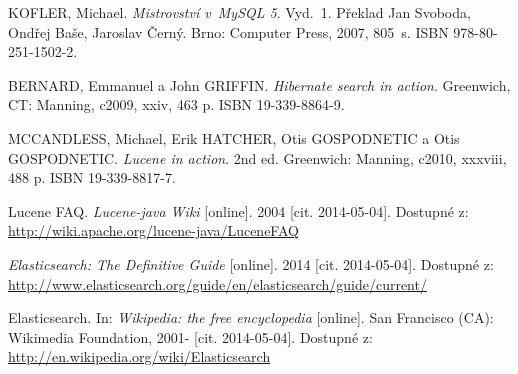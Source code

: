 \documentclass[11pt,oneside]{fithesis2}
\begin{document}
\begin{thebibliography}{1}

KOFLER, Michael. \textit{Mistrovství v~MySQL 5}. Vyd.~1. Překlad Jan Svoboda, Ondřej Baše, Jaroslav Černý. Brno: Computer Press, 2007, 805~s. ISBN 978-80-251-1502-2. 

BERNARD, Emmanuel a John GRIFFIN. \textit{Hibernate search in action}. Greenwich, CT: Manning, c2009, xxiv, 463 p. ISBN 19-339-8864-9. 

MCCANDLESS, Michael, Erik HATCHER, Otis GOSPODNETIC a Otis GOSPODNETIC. \textit{Lucene in action}. 2nd ed. Greenwich: Manning, c2010, xxxviii, 488 p. ISBN 19-339-8817-7. 

Lucene FAQ. \textit{Lucene-java Wiki} [online]. 2004 [cit. 2014-05-04]. Dostupné z: \url{http://wiki.apache.org/lucene-java/LuceneFAQ}

\textit{Elasticsearch: The Definitive Guide} [online]. 2014 [cit. 2014-05-04]. Dostupné z: \url{http://www.elasticsearch.org/guide/en/elasticsearch/guide/current/}

Elasticsearch. In: \textit{Wikipedia: the free encyclopedia} [online]. San Francisco (CA): Wikimedia Foundation, 2001- [cit. 2014-05-04]. Dostupné z: \url{http://en.wikipedia.org/wiki/Elasticsearch}

\end{thebibliography}

\endgroup

\appendix

\end{document}
